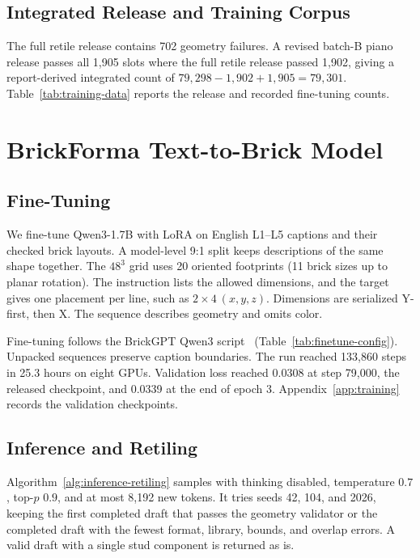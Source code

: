 \documentclass[letterpaper]{article} %
\begin{document}
\subsection{Integrated Release and Training Corpus}
The full retile release contains 702 geometry failures. A revised batch-B piano release passes all 1,905 slots where the full retile release passed 1,902, giving a report-derived integrated count of $79{,}298-1{,}902+1{,}905=79{,}301$. Table~\ref{tab:training-data} reports the release and recorded fine-tuning counts.


\section{BrickForma Text-to-Brick Model}
\label{sec:model}
\subsection{Fine-Tuning}
\label{sec:training}
We fine-tune Qwen3-1.7B with LoRA on English L1--L5 captions and their checked brick layouts. A model-level 9:1 split keeps descriptions of the same shape together. The $48^3$ grid uses 20 oriented footprints (11 brick sizes up to planar rotation). The instruction lists the allowed dimensions, and the target gives one placement per line, such as $2{\times}4\ (x,y,z)$. Dimensions are serialized Y-first, then X. The sequence describes geometry and omits color.

Fine-tuning follows the BrickGPT Qwen3 script~\cite{brickgpt} (Table~\ref{tab:finetune-config}). Unpacked sequences preserve caption boundaries. The run reached 133,860 steps in 25.3 hours on eight GPUs. Validation loss reached 0.0308 at step 79,000, the released checkpoint, and 0.0339 at the end of epoch 3. Appendix~\ref{app:training} records the validation checkpoints.


\subsection{Inference and Retiling}
Algorithm~\ref{alg:inference-retiling} samples with thinking disabled, temperature $0.7$, top-$p$ $0.9$, and at most 8,192 new tokens. It tries seeds 42, 104, and 2026, keeping the first completed draft that passes the geometry validator or the completed draft with the fewest format, library, bounds, and overlap errors. A valid draft with a single stud component is returned as is.
\end{document}
